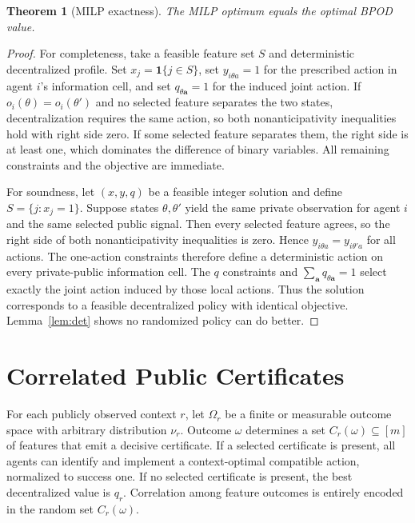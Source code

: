 \documentclass[11pt]{article}
\newtheorem{theorem}{Theorem}
\newcommand{\ind}{\mathbf{1}}
\begin{document}
\begin{theorem}[MILP exactness]\label{thm:milp-supp}
The MILP optimum equals the optimal BPOD value.
\end{theorem}
\begin{proof}
For completeness, take a feasible feature set $S$ and deterministic decentralized profile. Set $x_j=\ind\{j\in S\}$, set $y_{i\theta a}=1$ for the prescribed action in agent $i$'s information cell, and set $q_{\theta\mathbf a}=1$ for the induced joint action. If $o_i(\theta)=o_i(\theta')$ and no selected feature separates the two states, decentralization requires the same action, so both nonanticipativity inequalities hold with right side zero. If some selected feature separates them, the right side is at least one, which dominates the difference of binary variables. All remaining constraints and the objective are immediate.

For soundness, let $(x,y,q)$ be a feasible integer solution and define $S=\{j:x_j=1\}$. Suppose states $\theta,\theta'$ yield the same private observation for agent $i$ and the same selected public signal. Then every selected feature agrees, so the right side of both nonanticipativity inequalities is zero. Hence $y_{i\theta a}=y_{i\theta'a}$ for all actions. The one-action constraints therefore define a deterministic action on every private-public information cell. The $q$ constraints and $\sum_{\mathbf a}q_{\theta\mathbf a}=1$ select exactly the joint action induced by those local actions. Thus the solution corresponds to a feasible decentralized policy with identical objective. Lemma~\ref{lem:det} shows no randomized policy can do better.
\end{proof}

\section{Correlated Public Certificates}

For each publicly observed context $r$, let $\Omega_r$ be a finite or measurable outcome space with arbitrary distribution $\nu_r$. Outcome $\omega$ determines a set $C_r(\omega)\subseteq[m]$ of features that emit a decisive certificate. If a selected certificate is present, all agents can identify and implement a context-optimal compatible action, normalized to success one. If no selected certificate is present, the best decentralized value is $q_r$. Correlation among feature outcomes is entirely encoded in the random set $C_r(\omega)$.
\end{document}
